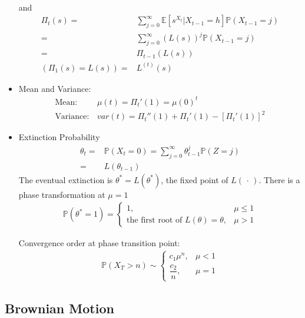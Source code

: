 \begin{itemize}[topsep=2pt,itemsep=0pt]
\begin{align}
    \end{align}
    and 
    \begin{align}
        \Pi_t(s)=&\sum_{j=0}^\infty \mathbb{E}\left[ s^{X_t}|X_{t-1}=h \right] \mathbb{P}\left( X_{t-1}=j \right) \\
        =&\sum_{j=0}^\infty \left(L(s)\right)^{j}\mathbb{P}\left( X_{t-1}=j \right) \\
        =&\Pi_{t-1}\left(L(s)\right)\\
        (\Pi_1(s)=L(s))=&L^{(t)}(s) 
    \end{align}
    \item Mean and Variance:
    \begin{align}
        \text{Mean}:&\, \mu (t) = \Pi_t'(1)=\mu(0) ^t\\
        \text{Variance}:&\,var(t)=\Pi_t''(1)+\Pi_t'(1)-[\Pi_t'(1)]^2
    \end{align}
    \item Extinction Probability
    \begin{align}
        \theta _t=&\mathbb{P}\left( X_t=0 \right)= \sum_{j=0}^\infty \theta ^j_{t-1}\mathbb{P}\left( Z=j \right) \\=
        &L(\theta _{t-1})
    \end{align}
    The eventual extinction is $ \theta ^*=L(\theta ^*) $, the fixed point of $ L(\, \cdot \, ) $.
    There is a phase transformation at $ \mu = 1 $
    \begin{align}
        \mathbb{P}\left( \theta ^*=1 \right) =\begin{cases}
            1,&\mu \leq 1\\
            \text{the first root of }L(\theta )=\theta ,& \mu >1
        \end{cases} 
    \end{align}
    
    Convergence order at phase transition point:
    \begin{align}
        \mathbb{P}\left( X_T>n \right) \sim \begin{cases}
            c_1\mu ^n,&\mu <1\\
            \dfrac{c_2}{n},&\mu =1
        \end{cases}  
    \end{align}
     
\end{itemize}


\subsection{Brownian Motion}
\hypertarget{BrownianProcess}{}

